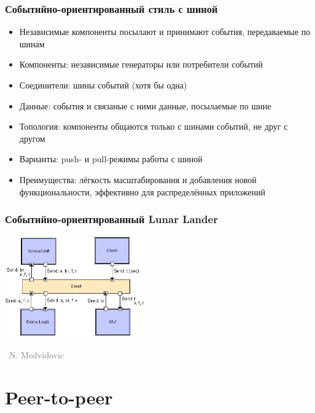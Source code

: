 \documentclass[xetex,mathserif,serif]{beamer}
\newcommand{\attribution}[1] {
    \vspace{-5mm}\begin{flushright}\begin{scriptsize}\textcolor{gray}{\textcopyright\, #1}\end{scriptsize}\end{flushright}
}
\begin{document}
    \begin{frame}
        \frametitle{Событийно-ориентированный стиль с шиной}
        \begin{itemize}
            \item Независимые компоненты посылают и принимают события, передаваемые по шинам
            \item Компоненты: независимые генераторы или потребители событий
            \item Соединители: шины событий (хотя бы одна)
            \item Данные: события и связаные с ними данные, посылаемые по шине
            \item Топология: компоненты общаются только с шинами событий, не друг с другом
            \item Варианты: push- и pull-режимы работы с шиной
            \item Преимущества: лёгкость масштабирования и добавления новой функциональности, эффективно для распределённых приложений
        \end{itemize}
    \end{frame}

    \begin{frame}
        \frametitle{Событийно-ориентированный Lunar Lander}
        \begin{center}
            \includegraphics[width=0.45\textwidth]{eventBasedLL.png}
            \attribution{N. Medvidovic}
        \end{center}
    \end{frame}

    \section{Peer-to-peer}
\end{document}
